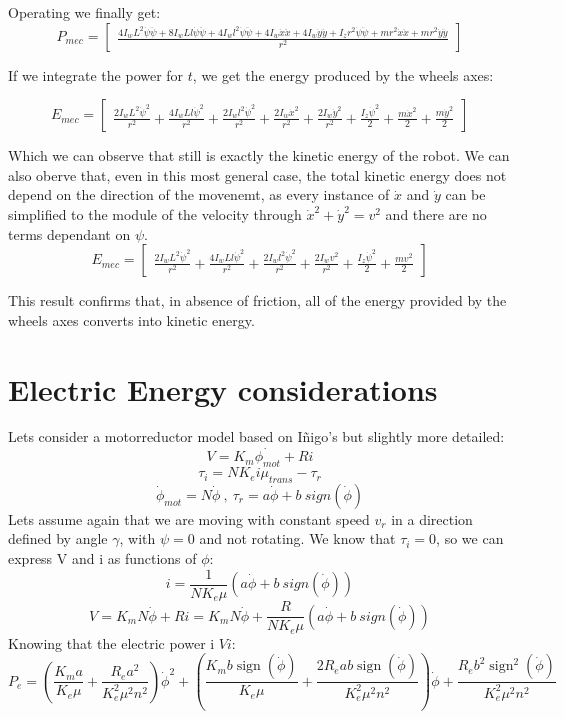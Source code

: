 \documentclass[12pt]{article}
\begin{document}
Operating we finally get:
$$ P_{mec} = \left[\begin{matrix}\frac{4 I_{w} L^{2} \dot{\psi} \ddot{\psi} + 8 I_{w} L l \dot{\psi} \ddot{\psi} + 4 I_{w} l^{2} \dot{\psi} \ddot{\psi} + 4 I_{w} \dot{x} \ddot{x} + 4 I_{w} \dot{y} \ddot{y} + I_{z} r^{2} \dot{\psi} \ddot{\psi} + m r^{2} \dot{x} \ddot{x} + m r^{2} \dot{y} \ddot{y}}{r^{2}}\end{matrix}\right]$$

If we integrate the power for $t$, we get the energy produced by the wheels axes:

$$E_{mec} = \left[\begin{matrix}\frac{2 I_{w} L^{2} \dot{\psi}^{2}}{r^{2}} + \frac{4 I_{w} L l \dot{\psi}^{2}}{r^{2}} + \frac{2 I_{w} l^{2} \dot{\psi}^{2}}{r^{2}} + \frac{2 I_{w} \dot{x}^{2}}{r^{2}} + \frac{2 I_{w} \dot{y}^{2}}{r^{2}} + \frac{I_{z} \dot{\psi}^{2}}{2} + \frac{m \dot{x}^{2}}{2} + \frac{m \dot{y}^{2}}{2}\end{matrix}\right]$$

Which we can observe that still is exactly the kinetic energy of the robot. We can also oberve that, even in this most general case, the total kinetic energy does not depend on the direction of the movenemt, as every instance of $\dot{x}$ and $\dot{y}$ can be simplified to the module of the velocity through $\dot{x}^2 + \dot{y}^2 = v^2$ and there are no terms dependant on $\psi$.
$$E_{mec} = \left[\begin{matrix}\frac{2 I_{w} L^{2} \dot{\psi}^{2}}{r^{2}} + \frac{4 I_{w} L l \dot{\psi}^{2}}{r^{2}} + \frac{2 I_{w} l^{2} \dot{\psi}^{2}}{r^{2}} + \frac{2 I_{w} v^{2}}{r^{2}} + \frac{I_{z} \dot{\psi}^{2}}{2} + \frac{m v^{2}}{2}\end{matrix}\right]$$

 This result confirms that, in absence of friction, all of the energy provided by the wheels axes converts into kinetic energy.
 
\section*{Electric Energy considerations}

Lets consider a motorreductor model based on Iñigo's but slightly more detailed:
$$ V = K_m \dot{\phi_{mot}} + Ri $$
$$ \tau_i = N K_ei \mu_{trans} - \tau_r $$
$$ \dot{\phi}_{mot} = N \dot{\phi}\ , \ \tau_r = a \dot{\phi} + b\ sign(\dot{\phi}) $$
Lets assume again that we are moving with constant speed $v_r$ in a direction defined by angle $\gamma$, with $\psi = 0$ and not rotating.
We know that $\tau_i = 0$, so we can express V and i as functions of $\phi$:
$$ i = \frac{1}{N K_e \mu}(a \dot{\phi} + b\ sign(\dot{\phi}) )$$
$$ V =  K_m N \dot{\phi} + Ri = K_m N \dot{\phi} +\frac{R}{N K_e \mu}(a \dot{\phi} + b\ sign(\dot{\phi}) )$$
Knowing that the electric power i $V i$:
$$ P_e = \left(\frac{K_{m} a}{K_{e} \mu} + \frac{R_{e} a^{2}}{K_{e}^{2} \mu^{2} n^{2}}\right) \dot{\phi}^{2} + \left(\frac{K_{m} b \operatorname{sign}\left(\dot{\phi}\right)}{K_{e} \mu} + \frac{2 R_{e} a b \operatorname{sign}\left(\dot{\phi}\right)}{K_{e}^{2} \mu^{2} n^{2}}\right) \dot{\phi} + \frac{R_{e} b^{2} \operatorname{sign}^{2}\left(\dot{\phi}\right)}{K_{e}^{2} \mu^{2} n^{2}}$$
\end{document}

